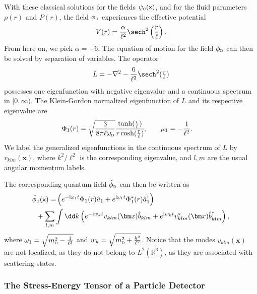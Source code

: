 \documentclass[letterpaper,12pt,titlepage,oneside,final]{book}
\newcommand{\mf}{\mathsf}%
\newcommand{\ii}{\mathrm{i}}
\newcommand{\tc}[1]{\textsc{#1}}
\begin{document}
With these classical solutions for the fields $\psi_\tc{c}(\mf x)$, and for the fluid parameters $\rho(r)$ and $P(r)$, the field $\phi_{\tc{d}}$ experiences the effective potential 
\begin{equation}
    V(r) = \frac{\alpha}{\ell^2} \sech^2\left(\frac{r}{\ell}\right).
\end{equation}
From here on, we pick $\alpha = -6$. The equation of motion for the field $\phi_\tc{d}$ can then be solved by separation of variables. The operator
\begin{equation}
    L = - \nabla^2 - \frac{6}{\ell^2}\sech^2(\tfrac{r}{\ell}) 
\end{equation}
possesses one eigenfunction with negative eigenvalue and a continuous spectrum in $[0,\infty)$. The Klein-Gordon normalized eigenfunction of $L$ and its respective eigenvalue are
\begin{align}
    \Phi_1(r) &= \sqrt{\frac{3}{8\pi \ell\omega_\tc{d}}}\frac{\tanh(\tfrac{r}{\ell})}{r \cosh(\tfrac{r}{\ell})}, &&& \mu_1 &= -\frac{1}{\ell^2}.\label{eq:Phi1}
\end{align}
We label the generalized eigenfunctions in the continuous spectrum of $L$ by $v_{klm}(\bm x)$, where $k^2/\ell^2$ is the corresponding eigenvalue, and $l,m$ are the usual angular momentum labels.

The corresponding quantum field $\hat{\phi}_\tc{d}$ can then be written as
\begin{align}
    \hat{\phi}_\tc{d}(\mf x) =& \left(e^{- \ii \omega_{1} t}\Phi_{1}(r) \hat{a}_{1} + e^{\ii \omega_{1} t}\Phi^*_{1}(r) \hat{a}^\dagger_{1}\right)\\
    &\!\!\!\!\!\!\!\!\!\!\!\!\!\!\!\!\!+ \sum_{l,m}\int\dd k \left(e^{- \ii w_{k} t}v_{klm}(\bm x) \hat{b}_{klm} +e^{\ii w_{k} t}v^*_{klm}(\bm x) \hat{b}^\dagger_{klm} \right),\nonumber
\end{align}
where $\omega_1 = \sqrt{m_\tc{d}^2 - \tfrac{1}{\ell^2}}$ and $w_{k} = \sqrt{m_{\tc{d}}^2 + \frac{k^2}{\ell^2}}$. Notice that the modes $v_{klm}(\bm x)$ are not localized, as they do not belong to $L^2(\mathbb{R}^3)$, as they are associated with scattering states.

\subsubsection*{The Stress-Energy Tensor of a Particle Detector}
\label{sec:tmunuexample}
\end{document}
